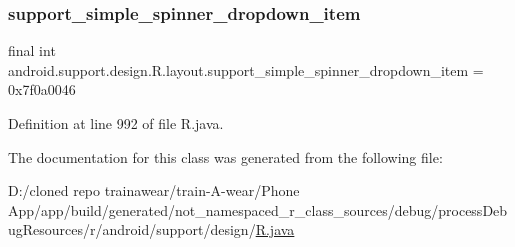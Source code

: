 \subsubsection{\texorpdfstring{support\_simple\_spinner\_dropdown\_item}{support\_simple\_spinner\_dropdown\_item}}
{\footnotesize\ttfamily final int android.\+support.\+design.\+R.\+layout.\+support\+\_\+simple\+\_\+spinner\+\_\+dropdown\+\_\+item = 0x7f0a0046\hspace{0.3cm}{\ttfamily [static]}}



Definition at line 992 of file R.\+java.



The documentation for this class was generated from the following file\+:\begin{DoxyCompactItemize}
\item 
D\+:/cloned repo trainawear/train-\/\+A-\/wear/\+Phone App/app/build/generated/not\+\_\+namespaced\+\_\+r\+\_\+class\+\_\+sources/debug/process\+Debug\+Resources/r/android/support/design/\mbox{\hyperlink{process_debug_resources_2r_2android_2support_2design_2_r_8java}{R.\+java}}\end{DoxyCompactItemize}
